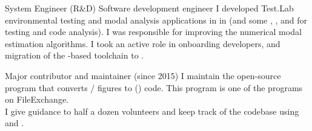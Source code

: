 \documentclass{cv-egeerardyn}
\begin{document}
\maketitle

\begin{experience}
  {System Engineer (R\&D)}
  {\softkinetic}
  {%
  \vspace{-3em} %
  }
  {Software development engineer}%
  {\lms}%
  {%
   I developed Test.Lab environmental testing and modal analysis applications in  in  (and some , , and  for testing and code analysis).
   I was responsible for improving the numerical modal estimation algorithms.
   I took an active role in onboarding  developers, and migration of the -based toolchain to .
  }

  {Major contributor and maintainer (since 2015)}%
  {\githubMatlabToTikz}{
  I maintain the open-source program  that converts / figures to  (\keyword{\LaTeX}) code.
  This program is one of the  programs on FileExchange.\\
  I give guidance to half a dozen volunteers and keep track of the codebase using  and .
  }

\end{experience}
\end{document}
